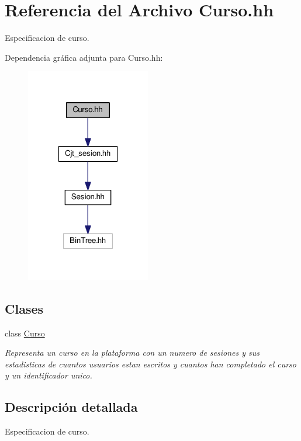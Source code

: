 \hypertarget{_curso_8hh}{}\section{Referencia del Archivo Curso.\+hh}
\label{_curso_8hh}


Especificacion de curso.  


Dependencia gráfica adjunta para Curso.\+hh\+:
\nopagebreak
\begin{figure}[H]
\begin{center}
\leavevmode
\includegraphics[width=154pt]{_curso_8hh__incl}
\end{center}
\end{figure}
\subsection*{Clases}
\begin{DoxyCompactItemize}
\item 
class \mbox{\hyperlink{class_curso}{Curso}}
\begin{DoxyCompactList}\small\item\em Representa un curso en la plataforma con un numero de sesiones y sus estadisticas de cuantos usuarios estan escritos y cuantos han completado el curso y un identificador unico. \end{DoxyCompactList}\end{DoxyCompactItemize}


\subsection{Descripción detallada}
Especificacion de curso. 

